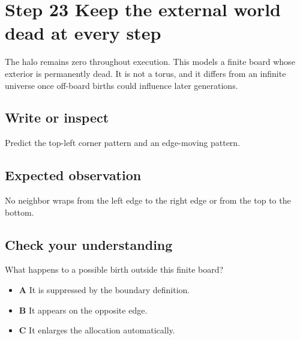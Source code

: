 \section{Step 23 Keep the external world dead at every
  step}\label{008-life-generations-s23-step-23-keep-the-external-world-dead-at-every-step}

The halo remains zero throughout execution. This models a finite board
whose exterior is permanently dead. It is not a torus, and it differs
from an infinite universe once off-board births could influence later
generations.

\subsection{Write or
  inspect}\label{008-life-generations-s23-write-or-inspect}

Predict the top-left corner pattern and an edge-moving pattern.

\subsection{Expected
  observation}\label{008-life-generations-s23-expected-observation}

No neighbor wraps from the left edge to the right edge or from the top
to the bottom.

\subsection{Check your
  understanding}\label{008-life-generations-s23-check-your-understanding}

What happens to a possible birth outside this finite board?

\begin{itemize}
  \tightlist
  \item
        \textbf{A} It is suppressed by the boundary definition.
  \item
        \textbf{B} It appears on the opposite edge.
  \item
        \textbf{C} It enlarges the allocation automatically.
\end{itemize}
